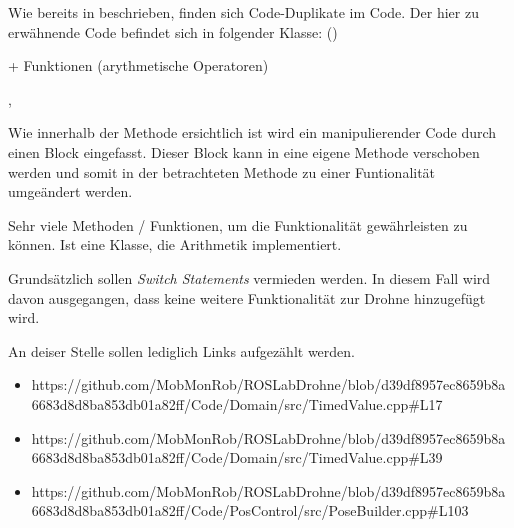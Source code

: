 







Wie bereits in  beschrieben, finden sich Code-Duplikate im Code.
Der hier zu erwähnende Code befindet sich in folgender Klasse:
 ()

+ Funktionen (arythmetische Operatoren)




, 

Wie innerhalb der Methode ersichtlich ist wird ein manipulierender Code durch einen Block eingefasst. Dieser Block kann in eine eigene Methode verschoben werden und somit in der betrachteten Methode zu einer Funtionalität umgeändert werden.






Sehr viele Methoden / Funktionen, um die Funktionalität gewährleisten zu können. Ist eine Klasse, die Arithmetik implementiert. 







Grundsätzlich sollen \textit{Switch Statements} vermieden werden.
In diesem Fall wird davon ausgegangen, dass keine weitere Funktionalität zur Drohne hinzugefügt wird.



An deiser Stelle sollen lediglich Links aufgezählt werden.

\begin{itemize}
\item https://github.com/MobMonRob/ROSLabDrohne/blob/d39df8957ec8659b8a6683d8d8ba853db01a82ff/Code/Domain/src/TimedValue.cpp\#L17
\item https://github.com/MobMonRob/ROSLabDrohne/blob/d39df8957ec8659b8a6683d8d8ba853db01a82ff/Code/Domain/src/TimedValue.cpp\#L39




\item https://github.com/MobMonRob/ROSLabDrohne/blob/d39df8957ec8659b8a6683d8d8ba853db01a82ff/Code/PosControl/src/PoseBuilder.cpp\#L103

\end{itemize}



